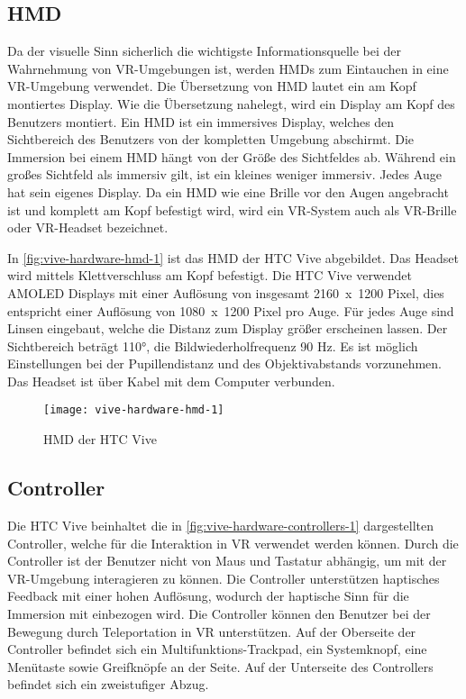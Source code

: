 \subsection{\acl{HMD}}
Da der visuelle Sinn \glqq sicherlich die wichtigste Informationsquelle bei der Wahrnehmung\grqq \cite{DoernerWahrnehmung} von \ac{VR}-Umgebungen ist, werden \ac{HMD}s zum Eintauchen in eine \ac{VR}-Umgebung verwendet. Die Übersetzung von \ac{HMD} lautet \glqq ein am Kopf montiertes Display\grqq. Wie die Übersetzung nahelegt, wird ein Display am Kopf des Benutzers montiert. Ein \ac{HMD} ist ein immersives Display, welches den Sichtbereich des Benutzers von der kompletten Umgebung abschirmt. Die Immersion bei einem \ac{HMD} hängt von der Größe des Sichtfeldes ab. Während ein großes Sichtfeld als immersiv gilt, ist ein kleines weniger immersiv. \cite{Doerner2019} Jedes Auge hat sein eigenes Display. Da ein \ac{HMD} wie eine Brille vor den Augen angebracht ist und komplett am Kopf befestigt wird, wird ein \ac{VR}-System auch als \ac{VR}-Brille oder \ac{VR}-Headset bezeichnet.

In \autoref{fig:vive-hardware-hmd-1} ist das \ac{HMD} der HTC Vive abgebildet. Das Headset wird mittels Klettverschluss am Kopf befestigt. Die HTC Vive verwendet AMOLED Displays mit einer Auflösung von insgesamt \mbox{2160 x 1200} Pixel, dies entspricht einer Auflösung von \mbox{1080 x 1200} Pixel pro Auge. Für jedes Auge sind Linsen eingebaut, welche die Distanz zum Display größer erscheinen lassen. Der Sichtbereich beträgt 110°, die Bildwiederholfrequenz 90 Hz. Es ist möglich Einstellungen bei der Pupillendistanz und des Objektivabstands vorzunehmen. Das Headset ist über Kabel mit dem Computer verbunden. \cite{ViveProduct}

\begin{figure}[!htbp]
	\centering
	\texttt{[image: vive-hardware-hmd-1]}
	\caption[HMD der HTC Vive]{\acs{HMD} der HTC Vive \cite{ViveHMD}}
	\label{fig:vive-hardware-hmd-1}
\end{figure}

\subsection{Controller}
\label{section:controller}
Die HTC Vive beinhaltet die in \autoref{fig:vive-hardware-controllers-1} dargestellten Controller, welche für die Interaktion in \ac{VR} verwendet werden können. Durch die Controller ist der Benutzer nicht von Maus und Tastatur abhängig, um mit der \ac{VR}-Umgebung interagieren zu können. Die Controller unterstützen haptisches Feedback mit einer hohen Auflösung, wodurch der haptische Sinn für die Immersion mit einbezogen wird. Die Controller können den Benutzer bei der Bewegung durch Teleportation in \ac{VR} unterstützen. Auf der Oberseite der Controller befindet sich ein Multifunktions-Trackpad, ein Systemknopf, eine Menütaste sowie Greifknöpfe an der Seite. Auf der Unterseite des Controllers befindet sich ein zweistufiger Abzug. \cite{ViveProduct}

